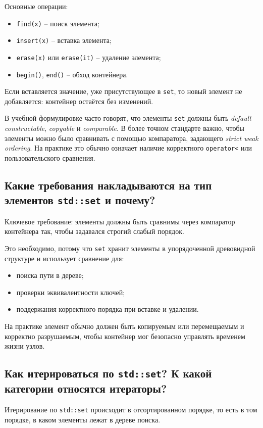 Основные операции:
\begin{itemize}
    \item \texttt{find(x)} -- поиск элемента;
    \item \texttt{insert(x)} -- вставка элемента;
    \item \texttt{erase(x)} или \texttt{erase(it)} -- удаление элемента;
    \item \texttt{begin()}, \texttt{end()} -- обход контейнера.
\end{itemize}

Если вставляется значение, уже присутствующее в \texttt{set}, то новый элемент не добавляется: контейнер остаётся без изменений.

\begin{remark}
В учебной формулировке часто говорят, что элементы \texttt{set} должны быть \textit{default constructable}, \textit{copyable} и \textit{comparable}. В более точном стандарте важно, чтобы элементы можно было сравнивать с помощью компаратора, задающего \textit{strict weak ordering}. На практике это обычно означает наличие корректного \texttt{operator<} или пользовательского сравнения.
\end{remark}

\subsection{Какие требования накладываются на тип элементов \texttt{std::set} и почему?}
Ключевое требование: элементы должны быть сравнимы через компаратор контейнера так, чтобы задавался строгий слабый порядок.

Это необходимо, потому что \texttt{set} хранит элементы в упорядоченной древовидной структуре и использует сравнение для:
\begin{itemize}
    \item поиска пути в дереве;
    \item проверки эквивалентности ключей;
    \item поддержания корректного порядка при вставке и удалении.
\end{itemize}

На практике элемент обычно должен быть копируемым или перемещаемым и корректно разрушаемым, чтобы контейнер мог безопасно управлять временем жизни узлов.

\subsection{Как итерироваться по \texttt{std::set}? К какой категории относятся итераторы?}
Итерирование по \texttt{std::set} происходит в отсортированном порядке, то есть в том порядке, в каком элементы лежат в дереве поиска.


